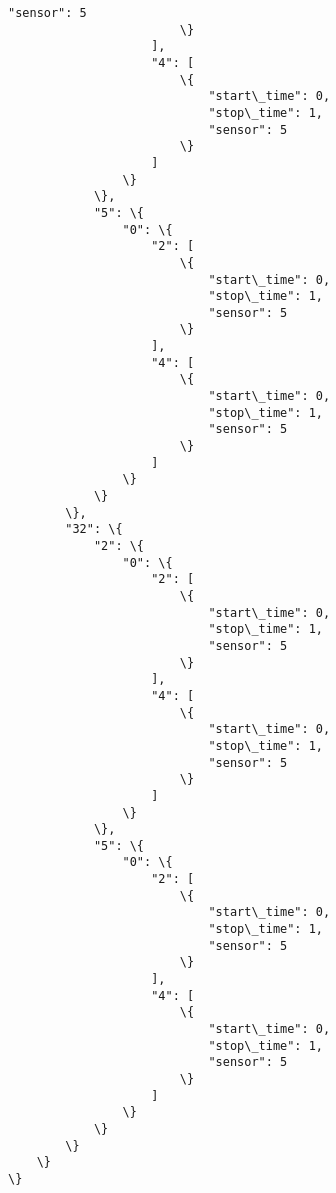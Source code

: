 \documentclass[11pt]{article}
\begin{document}
\begin{Verbatim}[commandchars=\\\{\}]
                            "sensor": 5
                        \}
                    ],
                    "4": [
                        \{
                            "start\_time": 0,
                            "stop\_time": 1,
                            "sensor": 5
                        \}
                    ]
                \}
            \},
            "5": \{
                "0": \{
                    "2": [
                        \{
                            "start\_time": 0,
                            "stop\_time": 1,
                            "sensor": 5
                        \}
                    ],
                    "4": [
                        \{
                            "start\_time": 0,
                            "stop\_time": 1,
                            "sensor": 5
                        \}
                    ]
                \}
            \}
        \},
        "32": \{
            "2": \{
                "0": \{
                    "2": [
                        \{
                            "start\_time": 0,
                            "stop\_time": 1,
                            "sensor": 5
                        \}
                    ],
                    "4": [
                        \{
                            "start\_time": 0,
                            "stop\_time": 1,
                            "sensor": 5
                        \}
                    ]
                \}
            \},
            "5": \{
                "0": \{
                    "2": [
                        \{
                            "start\_time": 0,
                            "stop\_time": 1,
                            "sensor": 5
                        \}
                    ],
                    "4": [
                        \{
                            "start\_time": 0,
                            "stop\_time": 1,
                            "sensor": 5
                        \}
                    ]
                \}
            \}
        \}
    \}
\}

    \end{Verbatim}
\end{document}
